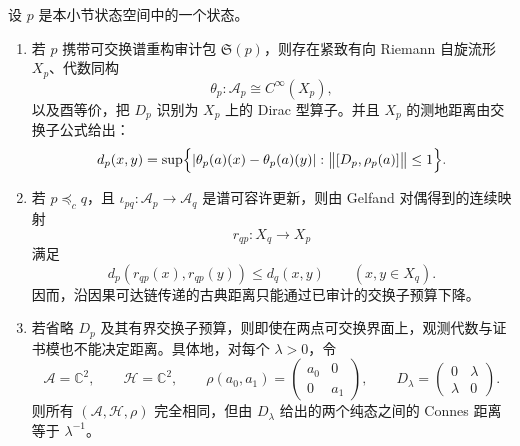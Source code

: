 \begin{theorem}[重构审计的古典性闸门与两点坏例子]\label{distill:connes_spectral_triples_and_chamseddine_connes_spectral_action-commutative_reconstruction_schema-classicality-gate-two-point}
设 \(p\) 是本小节状态空间中的一个状态。
\begin{enumerate}
  \item 若 \(p\) 携带可交换谱重构审计包 \(\mathfrak S(p)\)，则存在紧致有向 Riemann 自旋流形 \(X_p\)、代数同构
  \[
  \theta_p:\mathcal A_p\cong C^\infty(X_p),
  \]
  以及酉等价，把 \(D_p\) 识别为 \(X_p\) 上的 Dirac 型算子。并且 \(X_p\) 的测地距离由交换子公式给出：
  \[
  d_p(x,y)=\sup\Bigl\{|\theta_p(a)(x)-\theta_p(a)(y)|:
  \bigl\|[D_p,\rho_p(a)]\bigr\|\le 1\Bigr\}.
  \]
  \item 若 \(p\preceq_c q\)，且 \(\iota_{pq}:\mathcal A_p\to\mathcal A_q\) 是谱可容许更新，则由 Gelfand 对偶得到的连续映射
  \[
  r_{qp}:X_q\longrightarrow X_p
  \]
  满足
  \[
  d_p(r_{qp}(x),r_{qp}(y))\le d_q(x,y)
  \qquad (x,y\in X_q).
  \]
  因而，沿因果可达链传递的古典距离只能通过已审计的交换子预算下降。
  \item 若省略 \(D_p\) 及其有界交换子预算，则即使在两点可交换界面上，观测代数与证书模也不能决定距离。具体地，对每个 \(\lambda>0\)，令
  \[
  \mathcal A=\mathbb C^2,\qquad
  \mathcal H=\mathbb C^2,\qquad
  \rho(a_0,a_1)=
  \begin{pmatrix}
  a_0&0\\
  0&a_1
  \end{pmatrix},\qquad
  D_\lambda=
  \begin{pmatrix}
  0&\lambda\\
  \lambda&0
  \end{pmatrix}.
  \]
  则所有 \((\mathcal A,\mathcal H,\rho)\) 完全相同，但由 \(D_\lambda\) 给出的两个纯态之间的 Connes 距离等于 \(\lambda^{-1}\)。
\end{enumerate}
\end{theorem}
